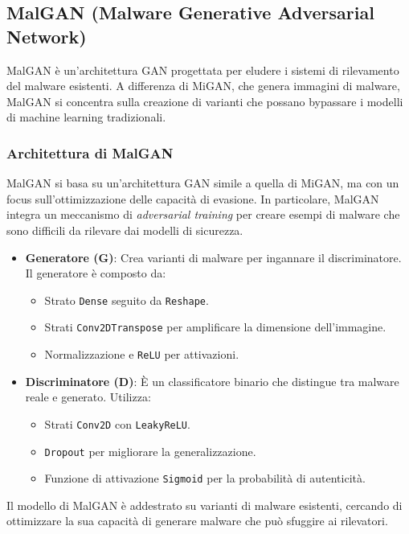 \subsection{MalGAN (Malware Generative Adversarial Network)}

MalGAN è un'architettura GAN progettata per eludere i sistemi di rilevamento del malware esistenti. A differenza di MiGAN, che genera immagini di malware, MalGAN si concentra sulla creazione di varianti che possano bypassare i modelli di machine learning tradizionali.

\subsubsection{Architettura di MalGAN}
MalGAN si basa su un'architettura GAN simile a quella di MiGAN, ma con un focus sull'ottimizzazione delle capacità di evasione. In particolare, MalGAN integra un meccanismo di \textit{adversarial training} per creare esempi di malware che sono difficili da rilevare dai modelli di sicurezza.
\begin{itemize}
    \item \textbf{Generatore (G)}: Crea varianti di malware per ingannare il discriminatore. Il generatore è composto da:
    \begin{itemize}
        \item Strato \texttt{Dense} seguito da \texttt{Reshape}.
        \item Strati \texttt{Conv2DTranspose} per amplificare la dimensione dell'immagine.
        \item Normalizzazione e \texttt{ReLU} per attivazioni.
    \end{itemize}
    \item \textbf{Discriminatore (D)}: È un classificatore binario che distingue tra malware reale e generato. Utilizza:
    \begin{itemize}
        \item Strati \texttt{Conv2D} con \texttt{LeakyReLU}.
        \item \texttt{Dropout} per migliorare la generalizzazione.
        \item Funzione di attivazione \texttt{Sigmoid} per la probabilità di autenticità.
    \end{itemize}
\end{itemize}
Il modello di MalGAN è addestrato su varianti di malware esistenti, cercando di ottimizzare la sua capacità di generare malware che può sfuggire ai rilevatori.

